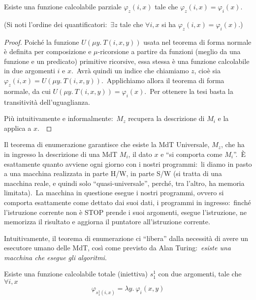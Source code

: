 \begin{theorem}[Enumerazione]
    \label{teo-enumerazione}
    Esiste una funzione calcolabile parziale $\varphi_z(i,x)$ tale che $\varphi_z(i,x) = \varphi_i(x)$.\

    (Si noti l'ordine dei quantificatori:\ $\exists z$ tale che $\forall i,x$ si ha $\varphi_z(i,x) = \varphi_i(x)$.)
\end{theorem}

\begin{proof}
    Poiché la funzione $U(\mu y.\ T(i, x, y))$ usata nel teorema di forma normale è definita per composizione e $\mu$-ricorsione a partire da funzioni (meglio da una funzione e un predicato) primitive ricorsive, essa stessa è una funzione calcolabile in due argomenti $i$ e $x$.\
    Avrà quindi un indice che chiamiamo $z$, cioè sia $\varphi_z(i, x) = U(\mu y.\ T(i, x, y))$.\
    Applichiamo allora il teorema di forma normale, da cui $U(\mu y.\ T(i, x, y)) = \varphi_i(x)$.\
    Per ottenere la tesi basta la transitività dell'uguaglianza.\

    Più intuitivamente e informalmente:\ $M_z$ recupera la descrizione di $M_i$ e la applica a $x$.\
\end{proof}

\noindent Il teorema di enumerazione garantisce che esiste la MdT Universale, $M_z$, che ha in ingresso la descrizione di una MdT $M_i$, il dato $x$ e ``si comporta come $M_i$''.\
È esattamente quanto avviene ogni giorno con i nostri programmi:\ li diamo in pasto a una macchina realizzata in parte H/W, in parte S/W (si tratta di una macchina reale, e quindi solo ``quasi-universale'', perché, tra l'altro, ha memoria limitata).\
La macchina in questione esegue i nostri programmi, ovvero si comporta esattamente come dettato dai suoi dati, i programmi in ingresso:\ finché l'istruzione corrente non è {\small STOP} prende i suoi argomenti, esegue l'istruzione, ne memorizza il risultato e aggiorna il puntatore all'istruzione corrente.

Intuitivamente, il teorema di enumerazione ci ``libera'' dalla necessità di avere un esecutore umano delle MdT, così come previsto da Alan Turing:\ \textit{esiste una macchina che esegue gli algoritmi}.

\begin{theorem}[Parametro, s-1-1]
    Esiste una funzione calcolabile totale (iniettiva) $s_1^1$ con due argomenti, tale che $\forall i,x$
    \[\varphi_{s_1^1(i,x)} = \lambda y.\ \varphi_i(x,y)\]
\end{theorem}

